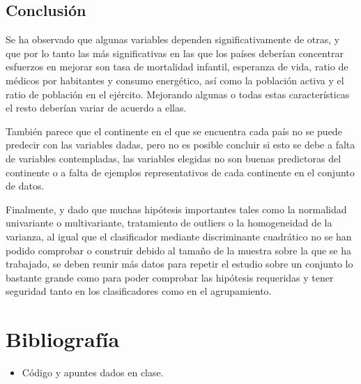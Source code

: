 \documentclass[twoside,openright,titlepage,numbers=noenddot,openany,headinclude,footinclude=true,
cleardoublepage=empty,abstractoff,BCOR=5mm,paper=a4,fontsize=12pt,main=spanish]{scrreprt}
\begin{document}
\section{Conclusión}

Se ha observado que algunas variables dependen significativamente de otras, y que por lo tanto las más significativas en las que los países deberían concentrar esfuerzos en mejorar son tasa de mortalidad infantil, esperanza de vida, ratio de médicos por habitantes y consumo energético, así como la población activa y el ratio de población en el ejército. Mejorando algunas o todas estas características el resto deberían variar de acuerdo a ellas.

También parece que el continente en el que se encuentra cada país no se puede predecir con las variables dadas, pero no es posible concluir si esto se debe a falta de variables contempladas, las variables elegidas no son buenas predictoras del continente o a falta de ejemplos representativos de cada continente en el conjunto de datos.

Finalmente, y dado que muchas hipótesis importantes tales como la normalidad univariante o multivariante, tratamiento de outliers o la homogeneidad de la varianza, al igual que el clasificador mediante discriminante cuadrático no se han podido comprobar o construir debido al tamaño de la muestra sobre la que se ha trabajado, se deben reunir más datos para repetir el estudio sobre un conjunto lo bastante grande como para poder comprobar las hipótesis requeridas y tener seguridad tanto en los clasificadores como en el agrupamiento.



%
\newpage


\chapter{Bibliografía}

\begin{itemize}
\item Código y apuntes dados en clase.
\end{itemize}

%
\end{document}
